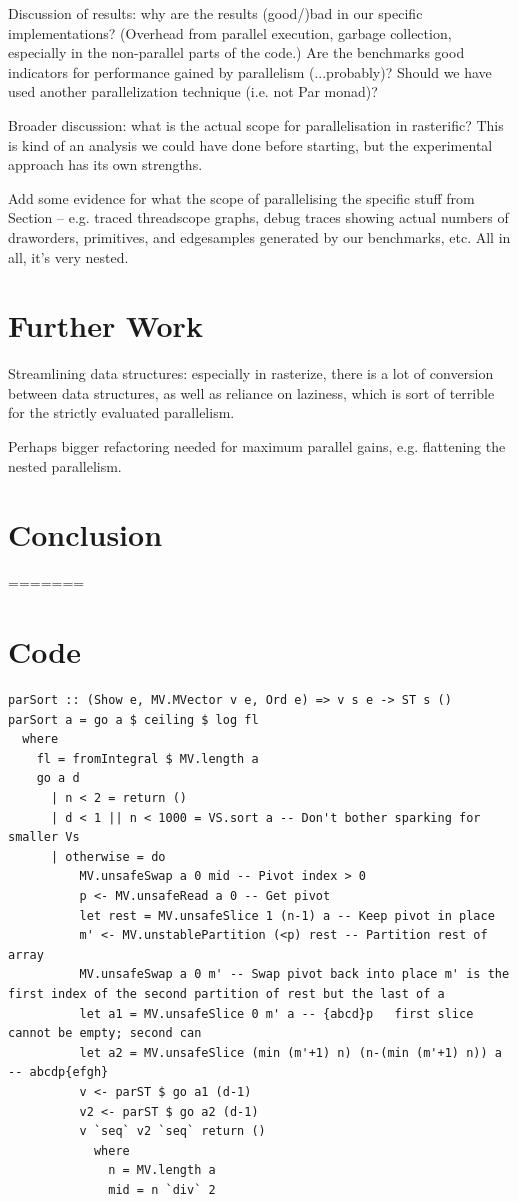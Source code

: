 \documentclass[12pt, a4paper]{article}
\begin{document}
Discussion of results: why are the results (good/)bad in our specific implementations? (Overhead from parallel execution, garbage collection, especially in the non-parallel parts of the code.)
Are the benchmarks good indicators for performance gained by parallelism (...probably)? Should we have used another parallelization technique (i.e. not Par monad)?

Broader discussion: what is the actual scope for parallelisation in rasterific? This is kind of an analysis we could have done before starting, but the experimental approach has its own strengths.

Add some evidence for what the scope of parallelising the specific stuff from Section \label{experiments} -- e.g. traced threadscope graphs, debug traces showing actual numbers of draworders, primitives, and edgesamples generated by our benchmarks, etc. All in all, it's very nested.

\section{Further Work}\label{furtherwork}

Streamlining data structures: especially in rasterize, there is a lot of conversion between data structures, as well as reliance on laziness, which is sort of terrible for the strictly evaluated parallelism.

Perhaps bigger refactoring needed for maximum parallel gains, e.g. flattening the nested parallelism.

\section{Conclusion}
=======
\clearpage
\appendix

\section{Code}
\begin{lstlisting}[label={lst:parsort}, caption={Parallel Sorting}]
parSort :: (Show e, MV.MVector v e, Ord e) => v s e -> ST s ()
parSort a = go a $ ceiling $ log fl
  where
    fl = fromIntegral $ MV.length a
    go a d
      | n < 2 = return ()
      | d < 1 || n < 1000 = VS.sort a -- Don't bother sparking for smaller Vs
      | otherwise = do
          MV.unsafeSwap a 0 mid -- Pivot index > 0
          p <- MV.unsafeRead a 0 -- Get pivot
          let rest = MV.unsafeSlice 1 (n-1) a -- Keep pivot in place
          m' <- MV.unstablePartition (<p) rest -- Partition rest of array
          MV.unsafeSwap a 0 m' -- Swap pivot back into place m' is the first index of the second partition of rest but the last of a
          let a1 = MV.unsafeSlice 0 m' a -- {abcd}p   first slice cannot be empty; second can
          let a2 = MV.unsafeSlice (min (m'+1) n) (n-(min (m'+1) n)) a -- abcdp{efgh}
          v <- parST $ go a1 (d-1)
          v2 <- parST $ go a2 (d-1)
          v `seq` v2 `seq` return ()
            where
              n = MV.length a
              mid = n `div` 2
\end{lstlisting}%
\end{document}
